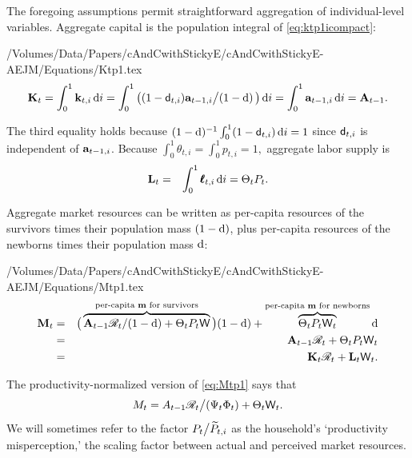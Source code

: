 The foregoing assumptions permit straightforward aggregation of individual-level variables.  Aggregate capital is the population integral of \eqref{eq:ktp1icompact}:
\begin{verbatimwrite}{/Volumes/Data/Papers/cAndCwithStickyE/cAndCwithStickyE-AEJM/Equations/Ktp1.tex}
\begin{equation}
\mathbf{K}_{t} = \int_{0}^{1} \mathbf{k}_{t,i}\,\text{d}i = \int_{0}^{1} \big((1 - \mathsf{d}_{t,i})\mathbf{a}_{t-1,i} \big/(1-\mathrm{d})\, \big)\,\text{d}i = \int_{0}^{1} \mathbf{a}_{t-1,i}\,\text{d}i = \mathbf{A}_{t-1}.   \label{eq:Ktp1}
\end{equation}
\end{verbatimwrite}

The third equality holds because $(1-\mathrm{d})^{-1}\int_{0}^{1}(1-\mathsf{d}_{t,i})\,\text{d}i = 1$
since $\mathsf{d}_{t,i}$ is independent of $\mathbf{a}_{t-1,i}$.
Because $\int_{0}^{1} \theta_{t,i} = \int_{0}^{1} {p}_{t,i} = 1,$ aggregate labor supply
is
\begin{eqnarray}
  \label{eq:Lt}
  \mathbf{L}_{t} & = & \int_{0}^{1} \pmb{\ell}_{t,i}\,\text{d}i = \Theta_{t} {P}_{t}.
\end{eqnarray}

Aggregate market resources can be written as per-capita resources of the survivors times their population mass $(1-\mathrm{d})$, plus per-capita resources of the newborns times their population mass $\mathrm{d}$:
\begin{verbatimwrite}{/Volumes/Data/Papers/cAndCwithStickyE/cAndCwithStickyE-AEJM/Equations/Mtp1.tex}
\begin{eqnarray}
  \mathbf{M}_{t} & = & \big(\overbrace{\mathbf{A}_{t-1} {\mathscr{R}}_t/(1-\mathrm{d})  + \Theta_{t} {P}_{t}\mathsf{W}}^{\text{per-capita $\mathbf{m}$ for survivors}}\big)(1-\mathrm{d})+\overbrace{\Theta_{t} {P}_{t}\mathsf{W}_t}^{\text{per-capita $\mathbf{m}$ for newborns}} \mathrm{d} \nonumber \\
                       & = & \mathbf{A}_{t-1} {\mathscr{R}}_t + \Theta_{t} P_t \mathsf{W}_t  \label{eq:Mtp1} \\
                       & = & \mathbf{K}_t \mathscr{R}_t + \mathbf{L}_t \mathsf{W}_t. \nonumber
\end{eqnarray}
\end{verbatimwrite}



The productivity-normalized version of \eqref{eq:Mtp1} says that
\begin{equation}\label{eq:Mtp1norm}
M_t = A_{t-1} \mathscr{R}_t\big/(\Psi_t \Phi_t) + \Theta_t \mathsf{W}_t.
\end{equation}
We will sometimes refer to the factor $P_t\big/\widetilde{P}_{t,i}$ as the household's `productivity misperception,' the scaling factor between actual and perceived market resources.


